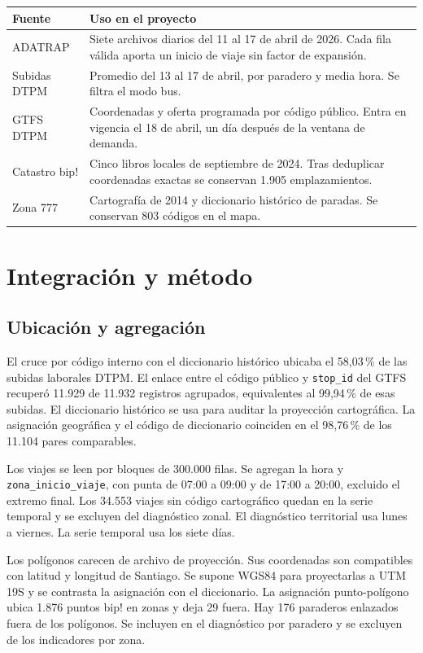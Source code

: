\documentclass[11pt,a4paper]{article}
\begin{document}
\begin{tabularx}{\linewidth}{@{}p{32mm}X@{}}
\toprule
\textbf{Fuente} & \textbf{Uso en el proyecto} \\
\midrule
ADATRAP \cite{dtpm} & Siete archivos diarios del 11 al 17 de abril de 2026. Cada fila válida aporta un inicio de viaje sin factor de expansión. \\
Subidas DTPM \cite{dtpm} & Promedio del 13 al 17 de abril, por paradero y media hora. Se filtra el modo bus. \\
GTFS DTPM \cite{gtfs} & Coordenadas y oferta programada por código público. Entra en vigencia el 18 de abril, un día después de la ventana de demanda. \\
Catastro bip! \cite{bip} & Cinco libros locales de septiembre de 2024. Tras deduplicar coordenadas exactas se conservan 1.905 emplazamientos. \\
Zona 777 \cite{dtpm} & Cartografía de 2014 y diccionario histórico de paradas. Se conservan 803 códigos en el mapa. \\
\bottomrule
\end{tabularx}

\clearpage
\section{Integración y método}

\subsection{Ubicación y agregación}

El cruce por código interno con el diccionario histórico ubicaba el 58,03\,\% de las subidas laborales DTPM. El enlace entre el código público y \texttt{stop\_id} del GTFS recuperó 11.929 de 11.932 registros agrupados, equivalentes al 99,94\,\% de esas subidas. El diccionario histórico se usa para auditar la proyección cartográfica. La asignación geográfica y el código de diccionario coinciden en el 98,76\,\% de los 11.104 pares comparables.

Los viajes se leen por bloques de 300.000 filas. Se agregan la hora y \texttt{zona\_inicio\_viaje}, con punta de 07:00 a 09:00 y de 17:00 a 20:00, excluido el extremo final. Los 34.553 viajes sin código cartográfico quedan en la serie temporal y se excluyen del diagnóstico zonal. El diagnóstico territorial usa lunes a viernes. La serie temporal usa los siete días.

Los polígonos carecen de archivo de proyección. Sus coordenadas son compatibles con latitud y longitud de Santiago. Se supone WGS84 para proyectarlas a UTM 19S y se contrasta la asignación con el diccionario. La asignación punto-polígono ubica 1.876 puntos bip! en zonas y deja 29 fuera. Hay 176 paraderos enlazados fuera de los polígonos. Se incluyen en el diagnóstico por paradero y se excluyen de los indicadores por zona.
\end{document}
